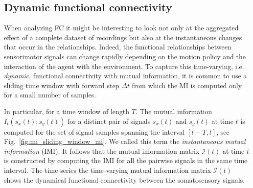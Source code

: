 \subsection{Dynamic functional connectivity}
When analyzing FC it might be interesting to look not only at the aggregated effect of a complete dataset of recordings but also at the instantaneous changes that occur in the relationships. Indeed, the functional relationships between sensorimotor signals can change rapidly depending on the motion policy and the interaction of the agent with the environment. To capture this time-varying, i.e. \emph{dynamic}, functional connectivity with mutual information, it is common to use a sliding time window \cite{Preti2017dynamicfunctionalconnectome} with forward step $\Delta t$ from which the MI is computed only for a small number of samples.

In particular, for a time window of length $T$. The mutual information $I_t(s_x(t);s_y(t))$ for a distinct pair of signals $s_x(t)$ and $s_y(t)$ at time $t$ is computed for the set of signal samples spanning the interval $\left[t-T,t\right]$, see Fig.~\ref{fig:mi_sliding_window_mi}. We called this term the \emph{instantaneous mutual information} (IMI). It follows that the mutual information matrix $\bm{\mathcal{I}}(t)$ at time $t$ is constructed by computing the IMI for all the pairwise signals in the same time interval. The time series the time-varying mutual information matrix $\bm{\mathcal{I}}(t)$ shows the dynamical functional connectivity between the somatosensory signals.


